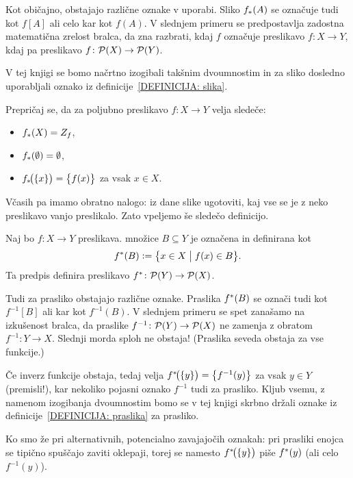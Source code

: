 		\begin{opomba}
			Kot običajno, obstajajo različne oznake v uporabi. Sliko $\img{f}{A}$ se označuje tudi kot $f[A]$ ali celo kar kot $f(A)$. V slednjem primeru se predpostavlja zadostna matematična zrelost bralca, da zna razbrati, kdaj $f$ označuje preslikavo $f\colon X \to Y$, kdaj pa preslikavo $f\colon \mathcal{P}(X) \to \mathcal{P}(Y)$.
			
			V tej knjigi se bomo načrtno izogibali takšnim dvoumnostim in za sliko dosledno uporabljali oznako iz definicije~\ref{DEFINICIJA: slika}.
		\end{opomba}
		
		\begin{vaja}
			Prepričaj se, da za poljubno preslikavo $f\colon X \to Y$ velja sledeče:
			\begin{itemize}
				\item
					$\img{f}{X} = \rn{f}$,
				\item
					$\img{f}{\emptyset} = \emptyset$,
				\item
					$\img[1]{f}{\set{x}} = \set[1]{f(x)}$ za vsak $x \in X$.
			\end{itemize}
		\end{vaja}
		
		
		Včasih pa imamo obratno nalogo: iz dane slike ugotoviti, kaj vse se je z neko preslikavo vanjo preslikalo. Zato vpeljemo še sledečo definicijo.
		
		\begin{definicija}\label{DEFINICIJA: praslika}
			Naj bo $f\colon X \to Y$ preslikava.  množice $B \subseteq Y$ je označena in definirana kot
			\[\pim{f}{B} \dfeq \set[1]{x \in X}{f(x) \in B}.\]
			Ta predpis definira preslikavo $\pim{f}\colon \pst(Y) \to \pst(X)$.
		\end{definicija}
		
		\begin{opomba}
			Tudi za prasliko obstajajo različne oznake. Praslika $\pim{f}{B}$ se označi tudi kot $f^{-1}[B]$ ali kar kot $f^{-1}(B)$. V slednjem primeru se spet zanašamo na izkušenost bralca, da praslike $f^{-1}\colon \mathcal{P}(Y) \to \mathcal{P}(X)$ ne zamenja z obratom $f^{-1}\colon Y \to X$. Slednji morda sploh ne obstaja! (Praslika seveda obstaja za vse funkcije.)
			
			Če inverz funkcije obstaja, tedaj velja $\pim[1]{f}{\set{y}} = \set[1]{f^{-1}(y)}$ za vsak $y \in Y$ (premisli!), kar nekoliko pojasni oznako $f^{-1}$ tudi za prasliko. Kljub vsemu, z namenom izogibanja dvoumnostim bomo se v tej knjigi skrbno držali oznake iz definicije~\ref{DEFINICIJA: praslika} za prasliko.
			
			Ko smo že pri alternativnih, potencialno zavajajočih oznakah: pri prasliki enojca se tipično spuščajo zaviti oklepaji, torej se namesto $\pim[1]{f}{\set{y}}$ piše $\pim{f}{y}$ (ali celo $f^{-1}(y)$).
		\end{opomba}
		
